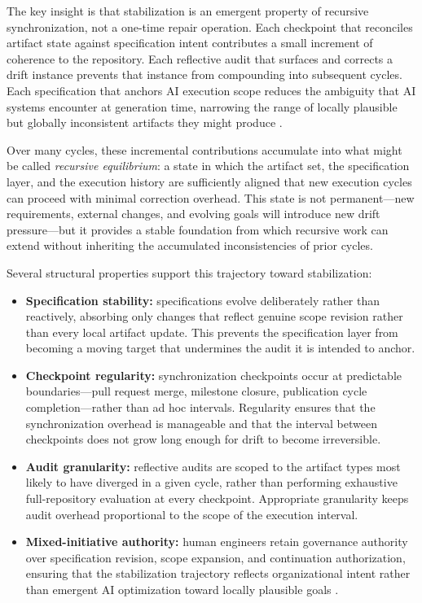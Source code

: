 The key insight is that stabilization is an emergent property of recursive synchronization, not a one-time repair operation. Each checkpoint that reconciles artifact state against specification intent contributes a small increment of coherence to the repository. Each reflective audit that surfaces and corrects a drift instance prevents that instance from compounding into subsequent cycles. Each specification that anchors AI execution scope reduces the ambiguity that AI systems encounter at generation time, narrowing the range of locally plausible but globally inconsistent artifacts they might produce \cite{Beer1972BrainFirm,Wiener1948Cybernetics}.

Over many cycles, these incremental contributions accumulate into what might be called \textit{recursive equilibrium}: a state in which the artifact set, the specification layer, and the execution history are sufficiently aligned that new execution cycles can proceed with minimal correction overhead. This state is not permanent---new requirements, external changes, and evolving goals will introduce new drift pressure---but it provides a stable foundation from which recursive work can extend without inheriting the accumulated inconsistencies of prior cycles.

Several structural properties support this trajectory toward stabilization:
\begin{itemize}
  \item \textbf{Specification stability:} specifications evolve deliberately rather than reactively, absorbing only changes that reflect genuine scope revision rather than every local artifact update. This prevents the specification layer from becoming a moving target that undermines the audit it is intended to anchor.
  \item \textbf{Checkpoint regularity:} synchronization checkpoints occur at predictable boundaries---pull request merge, milestone closure, publication cycle completion---rather than ad hoc intervals. Regularity ensures that the synchronization overhead is manageable and that the interval between checkpoints does not grow long enough for drift to become irreversible.
  \item \textbf{Audit granularity:} reflective audits are scoped to the artifact types most likely to have diverged in a given cycle, rather than performing exhaustive full-repository evaluation at every checkpoint. Appropriate granularity keeps audit overhead proportional to the scope of the execution interval.
  \item \textbf{Mixed-initiative authority:} human engineers retain governance authority over specification revision, scope expansion, and continuation authorization, ensuring that the stabilization trajectory reflects organizational intent rather than emergent AI optimization toward locally plausible goals \cite{Shneiderman2020HCAI,Amershi2014InteractiveML}.
\end{itemize}

